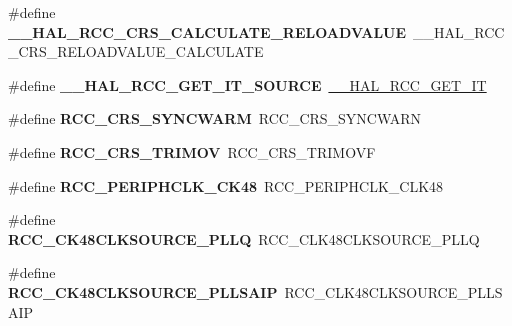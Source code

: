 \begin{DoxyCompactItemize}
\#define {\bfseries \+\_\+\+\_\+\+H\+A\+L\+\_\+\+R\+C\+C\+\_\+\+C\+R\+S\+\_\+\+C\+A\+L\+C\+U\+L\+A\+T\+E\+\_\+\+R\+E\+L\+O\+A\+D\+V\+A\+L\+UE}~\+\_\+\+\_\+\+H\+A\+L\+\_\+\+R\+C\+C\+\_\+\+C\+R\+S\+\_\+\+R\+E\+L\+O\+A\+D\+V\+A\+L\+U\+E\+\_\+\+C\+A\+L\+C\+U\+L\+A\+TE
\item 
\mbox{\label{group___h_a_l___r_c_c___aliased_gabfda03424b7b180eec4bad4bf9c76799}} 
\#define {\bfseries \+\_\+\+\_\+\+H\+A\+L\+\_\+\+R\+C\+C\+\_\+\+G\+E\+T\+\_\+\+I\+T\+\_\+\+S\+O\+U\+R\+CE}~\hyperlink{group___r_c_c___flags___interrupts___management_ga134af980b892f362c05ae21922cd828d}{\+\_\+\+\_\+\+H\+A\+L\+\_\+\+R\+C\+C\+\_\+\+G\+E\+T\+\_\+\+IT}
\item 
\mbox{\label{group___h_a_l___r_c_c___aliased_ga891dba525c7131dc45cd727be5964a98}} 
\#define {\bfseries R\+C\+C\+\_\+\+C\+R\+S\+\_\+\+S\+Y\+N\+C\+W\+A\+RM}~R\+C\+C\+\_\+\+C\+R\+S\+\_\+\+S\+Y\+N\+C\+W\+A\+RN
\item 
\mbox{\label{group___h_a_l___r_c_c___aliased_ga52aafca9877f3acfca85b91fca0d0ac4}} 
\#define {\bfseries R\+C\+C\+\_\+\+C\+R\+S\+\_\+\+T\+R\+I\+M\+OV}~R\+C\+C\+\_\+\+C\+R\+S\+\_\+\+T\+R\+I\+M\+O\+VF
\item 
\mbox{\label{group___h_a_l___r_c_c___aliased_ga3ee6866f9d2349cd1a099407d2a7664b}} 
\#define {\bfseries R\+C\+C\+\_\+\+P\+E\+R\+I\+P\+H\+C\+L\+K\+\_\+\+C\+K48}~R\+C\+C\+\_\+\+P\+E\+R\+I\+P\+H\+C\+L\+K\+\_\+\+C\+L\+K48
\item 
\mbox{\label{group___h_a_l___r_c_c___aliased_gaa6fb44c10b1f09d8ab50800d1ab7f4dd}} 
\#define {\bfseries R\+C\+C\+\_\+\+C\+K48\+C\+L\+K\+S\+O\+U\+R\+C\+E\+\_\+\+P\+L\+LQ}~R\+C\+C\+\_\+\+C\+L\+K48\+C\+L\+K\+S\+O\+U\+R\+C\+E\+\_\+\+P\+L\+LQ
\item 
\mbox{\label{group___h_a_l___r_c_c___aliased_ga61428387bb2476bd23229e8dc92570cd}} 
\#define {\bfseries R\+C\+C\+\_\+\+C\+K48\+C\+L\+K\+S\+O\+U\+R\+C\+E\+\_\+\+P\+L\+L\+S\+A\+IP}~R\+C\+C\+\_\+\+C\+L\+K48\+C\+L\+K\+S\+O\+U\+R\+C\+E\+\_\+\+P\+L\+L\+S\+A\+IP
\item 
\mbox{\label{group___h_a_l___r_c_c___aliased_ga7db3e05aa1e7a903e92ed57a5d9c1c06}} 

\end{DoxyCompactItemize}
